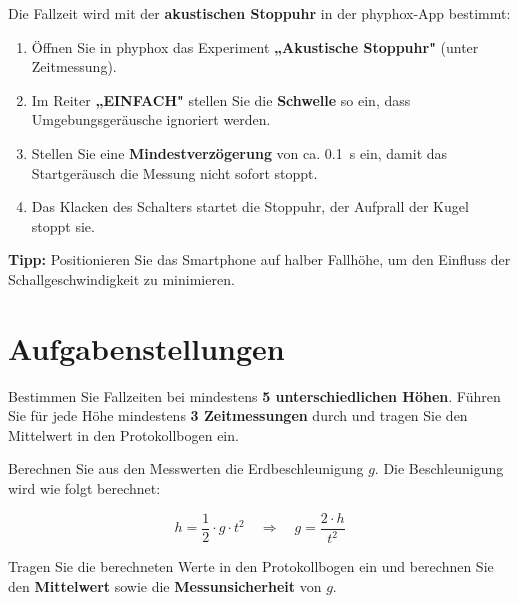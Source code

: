 \documentclass[11pt,a4paper]{scrartcl}
\begin{document}
\begin{center}
	\end{center}
	
	\begin{hilfebox}[title={\faIcon{lightbulb} Zeitmessung mit phyphox}]
		Die Fallzeit wird mit der \textbf{akustischen Stoppuhr} in der phyphox-App bestimmt:
		\begin{enumerate}
			\item Öffnen Sie in phyphox das Experiment \textbf{„Akustische Stoppuhr"} (unter Zeitmessung).
			\item Im Reiter \textbf{„EINFACH"} stellen Sie die \textbf{Schwelle} so ein, dass Umgebungsgeräusche ignoriert werden.
			\item Stellen Sie eine \textbf{Mindestverzögerung} von ca. \SI{0,1}{\second} ein, damit das Startgeräusch die Messung nicht sofort stoppt.
			\item Das Klacken des Schalters startet die Stoppuhr, der Aufprall der Kugel stoppt sie.
		\end{enumerate}
		\textbf{Tipp:} Positionieren Sie das Smartphone auf halber Fallhöhe, um den Einfluss der Schallgeschwindigkeit zu minimieren.
	\end{hilfebox}
	
	\section*{Aufgabenstellungen}
	
	\begin{aufgabe}[title={\faIcon{pencil-alt} Aufgabe 1: Messung}]
		Bestimmen Sie Fallzeiten bei mindestens \textbf{5 unterschiedlichen Höhen}. Führen Sie für jede Höhe mindestens \textbf{3 Zeitmessungen} durch und tragen Sie den Mittelwert in den Protokollbogen ein.
	\end{aufgabe}
	
	\begin{aufgabe}[title={\faIcon{pencil-alt} Aufgabe 2: Auswertung}]
		Berechnen Sie aus den Messwerten die Erdbeschleunigung $g$. Die Beschleunigung wird wie folgt berechnet:
		
		\begin{equation*}
			h = \frac{1}{2} \cdot g \cdot t^2 \quad \Rightarrow \quad g = \frac{2 \cdot h}{t^2}
		\end{equation*}
		
		Tragen Sie die berechneten Werte in den Protokollbogen ein und berechnen Sie den \textbf{Mittelwert} sowie die \textbf{Messunsicherheit} von $g$.
	\end{aufgabe}
	
\end{document}
